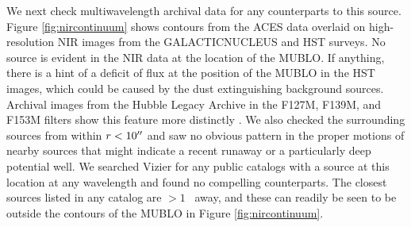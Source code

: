 \documentclass[]{aastex631}
\def\rr#1{\textbf{#1}}
\begin{document}
We next check multiwavelength archival data for any counterparts to this source.
Figure \ref{fig:nircontinuum} shows contours from the ACES data overlaid on high-resolution NIR images from the GALACTICNUCLEUS \citep{Nogueras-Lara2018,Nogueras-Lara2019} and HST \citep{Dong2011} surveys.
No source is evident in the NIR data at the location of the MUBLO.
If anything, there is a hint of a deficit of flux at the position of the MUBLO in the HST images, which could be caused by the dust extinguishing background sources.
Archival images from the Hubble Legacy Archive in the F127M, F139M, and F153M filters show this feature more distinctly \citep{Whitmore2016}.
We also checked the surrounding sources from \citet{Shahzamanian2022} within $r<10\mbox{$^{\prime\prime}$}$ and saw no obvious pattern in the proper motions of nearby sources that might indicate a recent runaway or a particularly deep potential well.
We searched Vizier \rr{\citep{Ochsenbein2000}} for any public catalogs with a source at this location at any wavelength and found no compelling counterparts.
The closest sources listed in any catalog are $>1$\arcsec~ away, and these can readily be seen to be outside the contours of the MUBLO in Figure \ref{fig:nircontinuum}.
\end{document}
